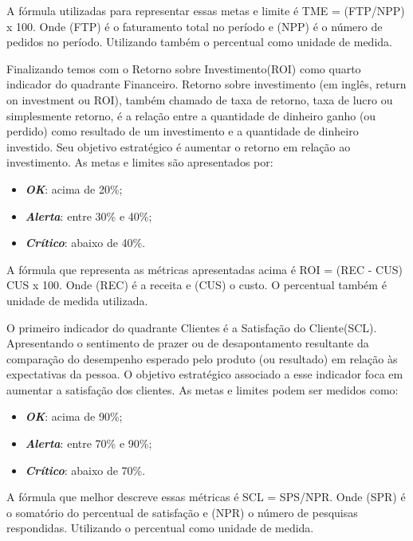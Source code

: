 \documentclass[
	12pt,				%
	openright,			%
	oneside,			%
	a4paper,			%
	english,			%
	brazil				%
	]{abntex2}
\begin{document}
A fórmula utilizadas para representar essas metas e limite é TME = (FTP/NPP) x 100. Onde (FTP) é o faturamento total no período e (NPP) é o número de pedidos no período. Utilizando também o percentual como unidade de medida.

Finalizando temos com o Retorno sobre Investimento(ROI) como quarto indicador do quadrante Financeiro. Retorno sobre investimento (em inglês, return on investment ou ROI), também chamado de  taxa de retorno, taxa de lucro ou simplesmente retorno, é a relação entre a quantidade de dinheiro ganho (ou perdido) como resultado de um investimento e a quantidade de dinheiro investido. Seu objetivo estratégico é aumentar o retorno em relação ao investimento. As metas e limites são apresentados por:
\begin{itemize}
\item  \textbf{\textit{OK}}: acima de 20\%;
\item  \textbf{\textit{Alerta}}: entre 30\% e 40\%;
\item  \textbf{\textit{Crítico}}: abaixo de 40\%.
\end{itemize}

A fórmula que representa as métricas apresentadas acima é ROI = (REC - CUS) CUS x 100. Onde (REC) é a receita e (CUS) o custo. O percentual também é unidade de medida utilizada. 

O primeiro indicador do quadrante Clientes é a Satisfação do Cliente(SCL). Apresentando o sentimento de prazer ou de desapontamento resultante da comparação do desempenho esperado pelo produto (ou resultado) em relação às expectativas da pessoa. O objetivo estratégico associado a esse indicador foca em aumentar a satisfação dos clientes. As metas e limites podem ser medidos como:
\begin{itemize}
\item  \textbf{\textit{OK}}: acima de 90\%;
\item  \textbf{\textit{Alerta}}: entre 70\% e 90\%;
\item  \textbf{\textit{Crítico}}: abaixo de 70\%.
\end{itemize}

A fórmula que melhor descreve essas métricas é SCL = SPS/NPR. Onde (SPR) é o somatório do percentual de satisfação e (NPR) o número de pesquisas respondidas. Utilizando o percentual como unidade de medida.
\end{document}
